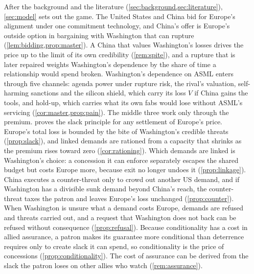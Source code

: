 After the background and the literature (\cref{sec:background,sec:literature}), \cref{sec:model} sets out the game. The United States and China bid for Europe's alignment under one commitment technology, and China's offer is Europe's outside option in bargaining with Washington that can rupture (\cref{lem:bidding,prop:master}). A China that values Washington's losses drives the price up to the limit of its own credibility (\cref{rem:spite}), and a rupture that is later repaired weights Washington's dependence by the share of time a relationship would spend broken. Washington's dependence on ASML enters through five channels: agenda power under rupture risk, the rival's valuation, self-harming sanctions and the silicon shield, which carry its loss $V$ if China gains the tools, and hold-up, which carries what its own fabs would lose without ASML's servicing (\cref{cor:master,prop:pain}). The middle three work only through the premium.  proves the slack principle for any settlement of Europe's price. Europe's total loss is bounded by the bite of Washington's credible threats (\cref{prop:slack}), and linked demands are rationed from a capacity that shrinks as the premium rises toward zero (\cref{cor:rationing}). Which demands are linked is Washington's choice: a concession it can enforce separately escapes the shared budget but costs Europe more, because exit no longer undoes it (\cref{prop:linkage}). China executes a counter-threat only to crowd out another US demand, and if Washington has a divisible sunk demand beyond China's reach, the counter-threat taxes the patron and leaves Europe's loss unchanged (\cref{prop:counter}). When Washington is unsure what a demand costs Europe, demands are refused and threats carried out, and a request that Washington does not back can be refused without consequence (\cref{prop:refusal}). Because conditionality has a cost in allied assurance, a patron makes its guarantee more conditional than deterrence requires only to create slack it can spend, so conditionality is the price of concessions (\cref{prop:conditionality}). The cost of assurance can be derived from the slack the patron loses on other allies who watch (\cref{rem:assurance}).

